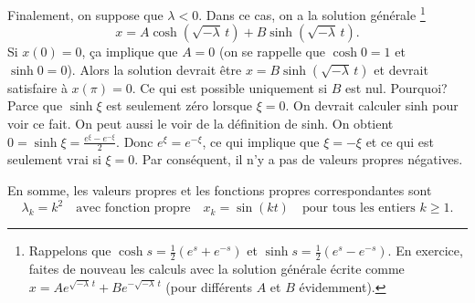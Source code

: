\begin{example}
Finalement, on suppose que $\lambda < 0$.  Dans ce cas, on a la solution générale \footnote{Rappelons que 
$\cosh s = \frac{1}{2}(e^s+e^{-s})$
et
$\sinh s = \frac{1}{2}(e^s-e^{-s})$.  En exercice, faites de nouveau les calculs avec la solution générale écrite comme 
$x = A e^{\sqrt{-\lambda}\, t} + B e^{-\sqrt{-\lambda}\, t}$ (pour différents  $A$ et $B$ évidemment).}
\begin{equation*}
x = A \cosh ( \sqrt{-\lambda}\, t) + B \sinh ( \sqrt{-\lambda}\, t ) .
\end{equation*}
Si $x(0) = 0$, ça implique que $A = 0$ (on se rappelle que $\cosh 0 = 1$ et $\sinh 0 =
0$).  Alors la solution devrait être $x = B \sinh ( \sqrt{-\lambda}\, t )$ et devrait satisfaire à 
$x(\pi) = 0$.  Ce qui est possible uniquement si $B$ est nul.  Pourquoi? Parce que 
$\sinh \xi$ est seulement zéro lorsque $\xi=0$.  On devrait calculer sinh pour voir ce fait. On peut aussi le voir de la définition de sinh. On obtient $0 = \sinh \xi = \frac{e^\xi -
e^{-\xi}}{2}$.  Donc $e^\xi = e^{-\xi}$, ce qui implique que $\xi = -\xi$ et ce qui est seulement vrai si $\xi=0$. Par conséquent, il n'y a pas de valeurs propres négatives.  

En somme, les valeurs propres et les fonctions propres correspondantes sont 
\begin{equation*}
\lambda_k = k^2 \quad \text{avec fonction propre} \quad x_k = \sin (k t)
\quad \text{pour tous les entiers } k \geq 1 .
\end{equation*}
\end{example}


